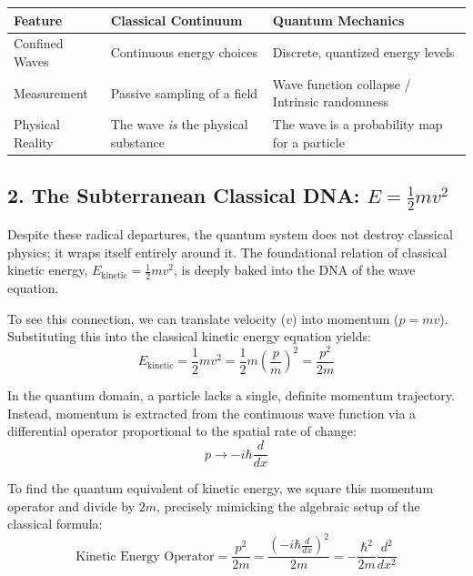 \begin{center}
\small
\begin{tabular}{lll}
\toprule
\textbf{Feature} & \textbf{Classical Continuum} & \textbf{Quantum Mechanics} \\
\midrule
Confined Waves & Continuous energy choices & Discrete, quantized energy levels \\
Measurement & Passive sampling of a field & Wave function collapse / Intrinsic randomness \\
Physical Reality & The wave \textit{is} the physical substance & The wave is a probability map for a particle \\
\bottomrule
\end{tabular}
\end{center}

\subsection*{2. The Subterranean Classical DNA: $E = \frac{1}{2}mv^2$}
Despite these radical departures, the quantum system does not destroy classical physics; it wraps itself entirely around it.
The foundational relation of classical kinetic energy, $E_{\text{kinetic}} = \frac{1}{2}mv^2$, is deeply baked into the DNA of the wave equation.

To see this connection, we can translate velocity ($v$) into momentum ($p = mv$).
Substituting this into the classical kinetic energy equation yields:
\begin{equation}
    E_{\text{kinetic}} = \frac{1}{2}mv^2 = \frac{1}{2}m\left(\frac{p}{m}\right)^2 = \frac{p^2}{2m}
\end{equation}

In the quantum domain, a particle lacks a single, definite momentum trajectory.
Instead, momentum is extracted from the continuous wave function via a differential operator proportional to the spatial rate of change:
\begin{equation}
    p \rightarrow -i\hbar\frac{d}{dx}
\end{equation}

To find the quantum equivalent of kinetic energy, we square this momentum operator and divide by $2m$, precisely mimicking the algebraic setup of the classical formula:
\begin{equation}
    \text{Kinetic Energy Operator} = \frac{p^2}{2m} = \frac{\left(-i\hbar\frac{d}{dx}\right)^2}{2m} = -\frac{\hbar^2}{2m}\frac{d^2}{dx^2}
\end{equation}

